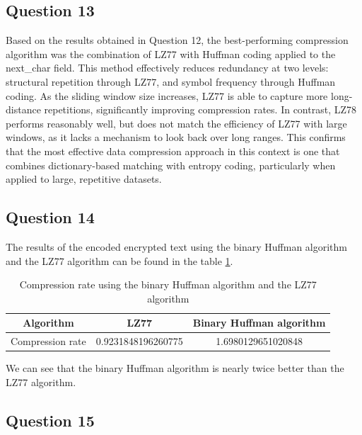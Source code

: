 \documentclass[]{template}
\begin{document}
    \subsection{Question 13}

    Based on the results obtained in Question 12, the best-performing compression algorithm was the combination of LZ77 with Huffman coding applied to the next\_char field. 
    This method effectively reduces redundancy at two levels: structural repetition through LZ77, and symbol frequency through Huffman coding. 
    As the sliding window size increases, LZ77 is able to capture more long-distance repetitions, significantly improving compression rates. 
    In contrast, LZ78 performs reasonably well, but does not match the efficiency of LZ77 with large windows, as it lacks a mechanism to look back over long ranges. 
    This confirms that the most effective data compression approach in this context is one that combines dictionary-based matching with entropy coding, particularly when applied to large, repetitive datasets.    

    \subsection{Question 14}

    The results of the encoded encrypted text using the binary Huffman algorithm and the LZ77 algorithm 
    can be found in the table \ref{tab:binary_huffman_lz77}.\\

    \begin{table}[ht]
        \centering
        \begin{tabular}{|c|c|c|}
        \hline
        Algorithm        & LZ77               & Binary Huffman algorithm \\ \hline
        Compression rate & 0.9231848196260775 & 1.6980129651020848       \\ \hline
        \end{tabular}
        \caption{Compression rate using the binary Huffman algorithm and the LZ77 algorithm}\label{tab:binary_huffman_lz77}
    \end{table}

    \noindent
    We can see that the binary Huffman algorithm is nearly twice better than the 
    LZ77 algorithm.\\

    \subsection{Question 15}
\end{document}
